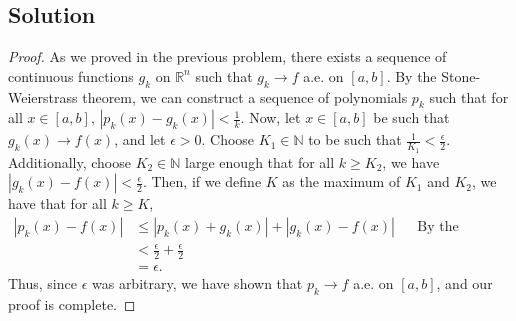 \documentclass[10pt,a4paper]{article}
\theoremstyle{theorem}
\theoremstyle{definition}
\begin{document}
\subsection*{Solution}
\begin{proof}
As we proved in the previous problem,  there exists a sequence of continuous functions $g_k$ on $\mathbb{R}^n$ such that $g_k \to f$ a.e. on $[a, b]$. By the Stone-Weierstrass theorem, we can construct a sequence of polynomials $p_k$ such that for all $x \in [a, b]$, $|p_k(x) - g_k(x)| < \frac{1}{k}$. Now, let $x \in [a, b]$ be such that $g_k(x) \to f(x)$, and let $\epsilon > 0$.  Choose $K_1 \in \mathbb{N}$ to be such that $\frac{1}{K_1} < \frac{\epsilon}{2}$. Additionally, choose $K_2 \in \mathbb{N}$ large enough that for all $k \geq K_2$, we have $|g_k(x) - f(x)| < \frac{\epsilon}{2}$. Then, if we define $K$ as the maximum of $K_1$ and $K_2$, we have that for all $k \geq K$,
\begin{align*}
|p_k(x) - f(x)| &\leq |p_k(x) + g_k(x)| + |g_k(x) - f(x)| &&\text{By the triangle inequality}\\
&< \frac{\epsilon}{2} + \frac{\epsilon}{2}\\
&= \epsilon.
\end{align*}
Thus, since $\epsilon$ was arbitrary, we have shown that $p_k \to f$ a.e. on $[a, b]$, and our proof is complete.
\end{proof}
\end{document}
